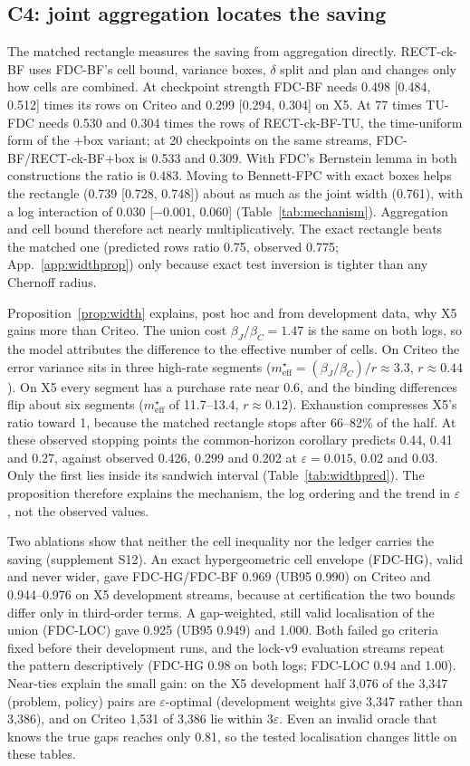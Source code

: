 \documentclass[sigconf,anonymous,review]{acmart}
\newcommand{\eps}{\varepsilon}
\newcommand{\meff}{m_{\text{eff}}}
\begin{document}
\subsection{C4: joint aggregation locates the saving}\label{sec:c4}

The matched rectangle measures the saving from aggregation directly. RECT-ck-BF uses FDC-BF's cell bound, variance boxes, $\delta$ split and plan and changes only how cells are combined. At checkpoint strength FDC-BF needs 0.498 [0.484, 0.512] times its rows on Criteo and 0.299 [0.294, 0.304] on X5. At 77 times TU-FDC needs 0.530 and 0.304 times the rows of RECT-ck-BF-TU, the time-uniform form of the +box variant; at 20 checkpoints on the same streams, FDC-BF/RECT-ck-BF+box is 0.533 and 0.309. With FDC's Bernstein lemma in both constructions the ratio is 0.483. Moving to Bennett-FPC with exact boxes helps the rectangle (0.739 [0.728, 0.748]) about as much as the joint width (0.761), with a log interaction of 0.030 [$-0.001$, 0.060] (Table~\ref{tab:mechanism}). Aggregation and cell bound therefore act nearly multiplicatively. The exact rectangle beats the matched one (predicted rows ratio 0.75, observed 0.775; App.~\ref{app:widthprop}) only because exact test inversion is tighter than any Chernoff radius.

Proposition~\ref{prop:width} explains, post hoc and from development data, why X5 gains more than Criteo. The union cost $\beta_J/\beta_C = 1.47$ is the same on both logs, so the model attributes the difference to the effective number of cells. On Criteo the error variance sits in three high-rate segments ($\meff^\star = (\beta_J/\beta_C)/r \approx 3.3$, $r \approx 0.44$). On X5 every segment has a purchase rate near 0.6, and the binding differences flip about six segments ($\meff^\star$ of 11.7--13.4, $r \approx 0.12$). Exhaustion compresses X5's ratio toward 1, because the matched rectangle stops after 66--82\% of the half. At these observed stopping points the common-horizon corollary predicts 0.44, 0.41 and 0.27, against observed 0.426, 0.299 and 0.202 at $\eps = 0.015$, 0.02 and 0.03. Only the first lies inside its sandwich interval (Table~\ref{tab:widthpred}). The proposition therefore explains the mechanism, the log ordering and the trend in $\eps$, not the observed values.

Two ablations show that neither the cell inequality nor the ledger carries the saving (supplement S12). An exact hypergeometric cell envelope (FDC-HG), valid and never wider, gave FDC-HG/FDC-BF 0.969 (UB95 0.990) on Criteo and 0.944--0.976 on X5 development streams, because at certification the two bounds differ only in third-order terms. A gap-weighted, still valid localisation of the union (FDC-LOC) gave 0.925 (UB95 0.949) and 1.000. Both failed go criteria fixed before their development runs, and the lock-v9 evaluation streams repeat the pattern descriptively (FDC-HG 0.98 on both logs; FDC-LOC 0.94 and 1.00). Near-ties explain the small gain: on the X5 development half 3,076 of the 3,347 (problem, policy) pairs are $\eps$-optimal (development weights give 3,347 rather than 3,386), and on Criteo 1,531 of 3,386 lie within $3\eps$. Even an invalid oracle that knows the true gaps reaches only 0.81, so the tested localisation changes little on these tables.
\end{document}

